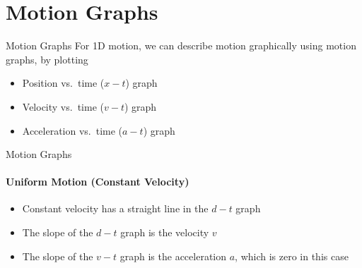 \documentclass[12pt,compress,aspectratio=169]{beamer}
\begin{document}
\section{Motion Graphs}

\begin{frame}{Motion Graphs}
  For 1D motion, we can describe motion graphically using motion graphs, by
  plotting
  \begin{itemize}
  \item Position vs.\ time ($x-t$) graph
  \item Velocity vs.\ time ($v-t$) graph
  \item Acceleration vs.\ time ($a-t$) graph
  \end{itemize}
\end{frame}


\begin{frame}{Motion Graphs}
  \framesubtitle{Uniform Motion (Constant Velocity)}
  \begin{center}
    \hspace{.15in}
    \hspace{.15in}
  \end{center}

  \begin{itemize}
  \item Constant velocity has a straight line in the $d-t$ graph
  \item The slope of the $d-t$ graph is the velocity $v$
  \item The slope of the $v-t$ graph is the acceleration $a$, which is zero in
    this case
  \end{itemize}
\end{frame}
\end{document}
